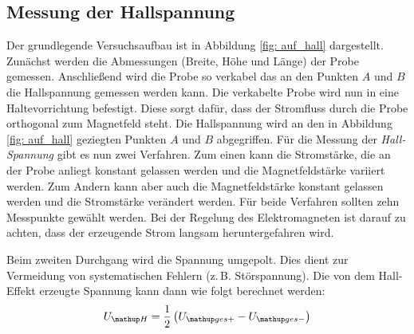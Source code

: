 \subsection{Messung der Hallspannung}
Der grundlegende Versuchsaufbau ist in Abbildung \ref{fig: auf_hall} dargestellt.
Zunächst werden die Abmessungen (Breite, Höhe und Länge) der Probe gemessen.
Anschließend wird die Probe so verkabel das an den Punkten $A$ und $B$ die
Hallspannung gemessen werden kann.
Die verkabelte Probe wird nun in eine Haltevorrichtung befestigt. Diese sorgt dafür, dass %
der Stromfluss durch die Probe orthogonal zum Magnetfeld steht.
Die Hallspannung wird an den in Abbildung \ref{fig: auf_hall} geziegten Punkten $A$ und $B$ abgegriffen.
Für die Messung der \emph{Hall-Spannung} gibt es nun zwei Verfahren.
Zum einen kann die Stromstärke, die an der Probe anliegt konstant gelassen werden und
die Magnetfeldstärke variiert werden. Zum Andern kann
aber auch die Magnetfeldstärke konstant gelassen werden und die Stromstärke verändert
werden. Für beide Verfahren sollten zehn Messpunkte gewählt werden.
Bei der Regelung des Elektromagneten ist darauf zu achten, dass der
erzeugende Strom langsam heruntergefahren wird.

Beim zweiten Durchgang wird die Spannung umgepolt. %
Dies dient zur Vermeidung von systematischen Fehlern (z.\,B. Störspannung).
Die von dem Hall-Effekt erzeugte Spannung kann dann wie folgt berechnet werden: %
\begin{equation} %
\label{eq:hall_spann}
U\ua{H}=\frac{1}{2}\left(U\ua{ges+}-U\ua{ges-}\right)
\end{equation}
